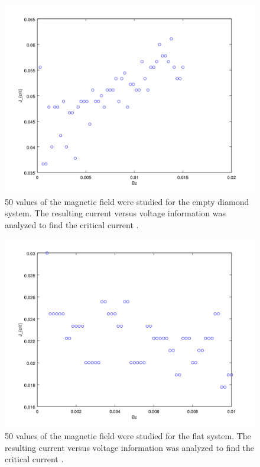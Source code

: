 \begin{figure}[htbp]
\begin{center}
\includegraphics[scale=.50]{emptyBz.png}
\caption{ 50 values of the magnetic field were studied for the empty diamond system. The resulting current versus voltage information was analyzed to find the critical current .  }
\label{emptyBz}
\end{center}
\end{figure}

\begin{figure}[htbp]
\begin{center}
\includegraphics[scale=.50]{flatBz.png}
\caption{ 50 values of the magnetic field were studied for the flat system. The resulting current versus voltage information was analyzed to find the critical current .  }
\label{flatBz}
\end{center}
\end{figure}

